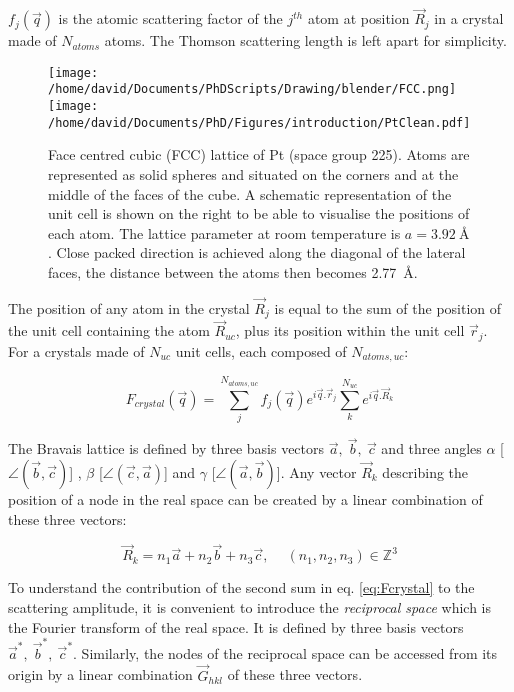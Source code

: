 $f_j(\vec{q})$ is the atomic scattering factor of the $j^{th}$ atom at position $\vec{R}_j$ in a crystal made of $N_{atoms}$ atoms.
The Thomson scattering length is left apart for simplicity.

\begin{figure}[!htb]
    \centering
    \texttt{[image: /home/david/Documents/PhDScripts/Drawing/blender/FCC.png]}
    \texttt{[image: /home/david/Documents/PhD/Figures/introduction/PtClean.pdf]}
    \caption{
    Face centred cubic (FCC) lattice of Pt (space group 225).
    Atoms are represented as solid spheres and situated on the corners and at the middle of the faces of the cube.
    A schematic representation of the unit cell is shown on the right to be able to visualise the positions of each atom.
    The lattice parameter at room temperature is $a = \qty{3.92}{\angstrom}$.
    Close packed direction is achieved along the diagonal of the lateral faces, the distance between the atoms then becomes \qty{2.77}{\angstrom}.
    }
    \label{fig:fcc}
\end{figure}

The position of any atom in the crystal $\vec{R}_j$ is equal to the sum of the position of the unit cell containing the atom $\vec{R}_{uc}$, plus its position within the unit cell $\vec{r}_j$.
For a crystals made of $N_{uc}$ unit cells, each composed of $N_{atoms,uc}$:

\begin{equation}
    F_{crystal}(\vec{q}) = \sum_j^{N_{atoms,uc}} f_j(\vec{q}) e^{i\vec{q}.\vec{r}_j} \sum_k^{N_{uc}} e^{i\vec{q}.\vec{R}_k}
    \label{eq:Fcrystal}
\end{equation}

The Bravais lattice is defined by three basis vectors $\vec{a},\ \vec{b},\ \vec{c}$ and three angles $\alpha$ [$\angle (\vec{b}, \vec{c})$] , $\beta$ [$\angle (\vec{c}, \vec{a})$] and $\gamma$ [$\angle (\vec{a}, \vec{b})$].
Any vector $\vec{R}_k$ describing the position of a node in the real space can be created by a linear combination of these three vectors:

\begin{equation}
    \label{eq:R_k}
    \vec{R}_k=n_1\vec{a} + n_2\vec{b} + n_3\vec{c}, \quad \ (n_1,n_2,n_3) \in \mathbb{Z}^3
\end{equation}

To understand the contribution of the second sum in eq. \ref{eq:Fcrystal} to the scattering amplitude, it is convenient to introduce the \textit{reciprocal space} which is the Fourier transform of the real space.
It is defined by three basis vectors $\vec{a}^*,\ \vec{b}^*,\ \vec{c}^*$.
Similarly, the nodes of the reciprocal space can be accessed from its origin by a linear combination $\vec{G}_{hkl}$ of these three vectors.


